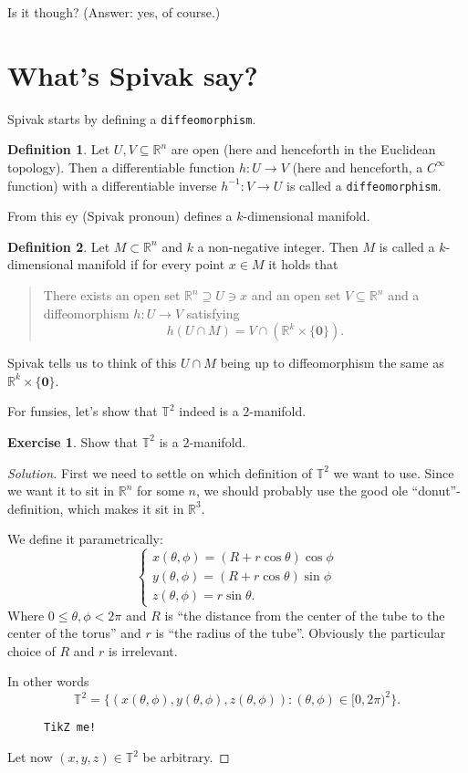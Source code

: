 \documentclass{article}
\theoremstyle{definition}
\newtheorem{defi}{Definition}
\newtheorem{ex}{Exercise}
\begin{document}
Is it though? (Answer: yes, of course.)
\section*{What's Spivak say?}
Spivak starts by defining a {\tt diffeomorphism}.
\begin{defi}
  Let $U,V\subseteq\mathbb{R}^n$ are open (here and henceforth in the Euclidean topology). Then a differentiable function $h:U\to V$ (here and henceforth, a $C^\infty$ function) with a differentiable inverse $h^{-1}:V\to U$ is called a {\tt diffeomorphism}.
\end{defi}
From this ey (Spivak pronoun) defines a $k$-dimensional manifold.
\begin{defi}
  Let $M\subset\mathbb{R}^n$ and $k$ a non-negative integer. Then $M$ is called a $k$-dimensional manifold if for every point $x\in M$ it holds that
  \begin{quotation}
    There exists an open set $\mathbb{R}^n\supseteq U\ni x$ and an open set $V\subseteq\mathbb{R}^n$ and a diffeomorphism $h:U\to V$ satisfying
    \[h(U\cap M)=V\cap(\mathbb{R}^k\times\{\mathbf{0}\}).\]
  \end{quotation}
\end{defi}
Spivak tells us to think of this $U\cap M$ being up to diffeomorphism the same as $\mathbb{R}^k\times\{\mathbf{0}\}$.

For funsies, let's show that $\mathbb{T}^2$ indeed is a $2$-manifold.
\begin{ex}
  Show that $\mathbb{T}^2$ is a $2$-manifold.
\end{ex}
\begin{proof}[Solution]
  First we need to settle on which definition of $\mathbb{T}^2$ we want to use. Since we want it to sit in $\mathbb{R}^n$ for some $n$, we should probably use the good ole ``donut''-definition, which makes it sit in $\mathbb{R}^3$.

  We define it parametrically:
  \[\begin{cases}
    x(\theta,\phi)=(R+r\cos\theta)\cos\phi\\
    y(\theta,\phi)=(R+r\cos\theta)\sin\phi\\
    z(\theta,\phi)=r\sin\theta.
  \end{cases}\]
  Where $0\leq\theta,\phi<2\pi$ and $R$ is ``the distance from the center of the tube to the center of the torus'' and $r$ is ``the radius of the tube''. Obviously the particular choice of $R$ and $r$ is irrelevant.

  In other words
  \[\mathbb{T}^2=\{(x(\theta,\phi),y(\theta,\phi),z(\theta,\phi)):(\theta,\phi)\in [0,2\pi)^2\}.\]

  \begin{figure}[h]
    \centering
    {\tt TikZ me!}
  \end{figure}
  
  Let now $(x,y,z)\in\mathbb{T}^2$ be arbitrary.
\end{proof}
\end{document}
